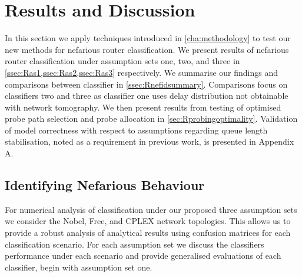\chapter{Results and Discussion}
\label{cha:result}
In this section we apply techniques introduced in \cref{cha:methodology} to test our new methods for nefarious router classification. We present results of nefarious router classification under assumption sets one, two, and three in \cref{ssec:Ras1,ssec:Ras2,ssec:Ras3} respectively. We summarise our findings and comparisons between classifier in \cref{ssec:Rnefidsummary}. Comparisons focus on classifiers two and three as classifier one uses delay distribution not obtainable with network tomography. We then present results from testing of optimised probe path selection and probe allocation in \cref{sec:Rprobingoptimality}. Validation of model correctness with respect to assumptions regarding queue length stabilisation, noted as a requirement in previous work, is presented in Appendix A.

\section{Identifying Nefarious Behaviour}
\label{sec:Rnefarouterdetection}
For numerical analysis of classification under our proposed three assumption sets we consider the Nobel, Free, and CPLEX network topologies. This allows us to provide a robust analysis of analytical results using confusion matrices for each classification scenario. For each assumption set we discuss the classifiers performance under each scenario and provide generalised evaluations of each classifier, begin with assumption set one.

